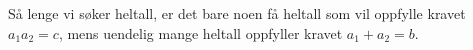 






\opgt	
{} 
\selos


Så lenge vi søker heltall, er det bare noen få heltall som vil oppfylle kravet $ a_1a_2=c $, mens uendelig mange heltall oppfyller kravet $ a_1+a_2=b $.



